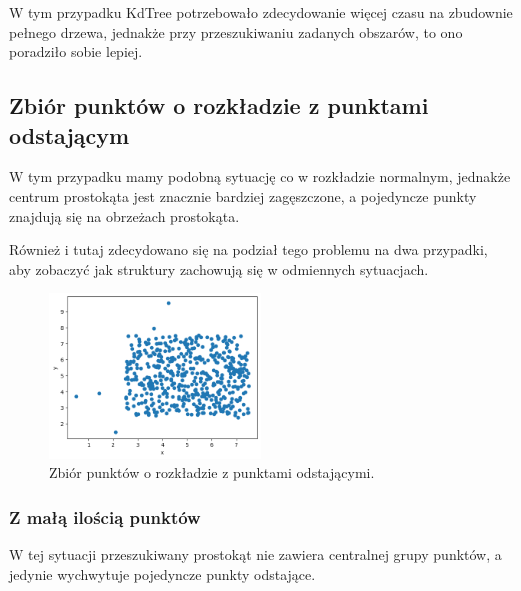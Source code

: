 \documentclass{lab}
\begin{document}
W tym przypadku KdTree potrzebowało zdecydowanie więcej czasu na zbudownie pełnego drzewa, jednakże przy przeszukiwaniu zadanych obszarów, to ono poradziło sobie lepiej.

\newpage
\subsection{Zbiór punktów o rozkładzie z punktami odstającym}
W tym przypadku mamy podobną sytuację co w rozkładzie normalnym, jednakże centrum prostokąta jest znacznie bardziej zagęszczone, a pojedyncze punkty znajdują się na obrzeżach prostokąta.

Również i tutaj zdecydowano się na podział tego problemu na dwa przypadki, aby zobaczyć jak struktury zachowują się w odmiennych sytuacjach.

\begin{figure}[H]
  \centering
  \includegraphics[width=0.5\textwidth]{resources/outlier.png}
  \caption{Zbiór punktów o rozkładzie z punktami odstającymi.}
  \label{fig:outlier}
\end{figure}

\subsubsection{Z małą ilością punktów}
W tej sytuacji przeszukiwany prostokąt nie zawiera centralnej grupy punktów, a jedynie wychwytuje pojedyncze punkty odstające.
\end{document}
